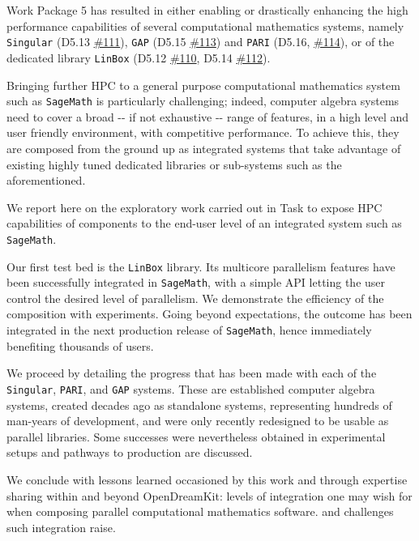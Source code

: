 Work Package 5 has resulted in either enabling or drastically enhancing
the high performance capabilities of several computational mathematics
systems, namely \texttt{Singular} (D5.13
\href{https://github.com/OpenDreamKit/OpenDreamKit/issues/111}{\#111}),
\texttt{GAP} (D5.15
\href{https://github.com/OpenDreamKit/OpenDreamKit/issues/113}{\#113})
and \texttt{PARI} (D5.16,
\href{https://github.com/OpenDreamKit/OpenDreamKit/issues/114}{\#114}),
or of the dedicated library \texttt{LinBox} (D5.12
\href{https://github.com/OpenDreamKit/OpenDreamKit/issues/110}{\#110},
D5.14
\href{https://github.com/OpenDreamKit/OpenDreamKit/issues/112}{\#112}).

Bringing further HPC to a general purpose computational mathematics
system such as \texttt{SageMath} is particularly challenging; indeed,
computer algebra systems need to cover a broad -\/- if not exhaustive -\/- range of
features, in a high level and user friendly environment, with
competitive performance. To achieve this, they are composed from the
ground up as integrated systems that take advantage of existing highly
tuned dedicated libraries or sub-systems such as the aforementioned.

We report here on the exploratory work carried out in Task to expose
HPC capabilities of components to the end-user level of an integrated
system such as \texttt{SageMath}.

Our first test bed is the \texttt{LinBox} library. Its multicore
parallelism features have been successfully integrated in \texttt{SageMath},
with a simple API letting the user control the desired level of
parallelism. We demonstrate the efficiency of the composition with
experiments. Going beyond expectations, the outcome has been integrated
in the next production release of \texttt{SageMath}, hence immediately
benefiting thousands of users.

We proceed by detailing the progress that has been made with each of the
\texttt{Singular}, \texttt{PARI}, and \texttt{GAP} systems. These are established
computer algebra systems, created decades ago as standalone systems,
representing hundreds of man-years of development, and were only recently
redesigned to be usable as parallel libraries. Some successes were
nevertheless obtained in experimental setups and pathways to production
are discussed.

We conclude with lessons learned occasioned by this work and
through expertise sharing within and beyond OpenDreamKit: levels of
integration one may wish for when composing parallel computational
mathematics software. and challenges such integration raise.
